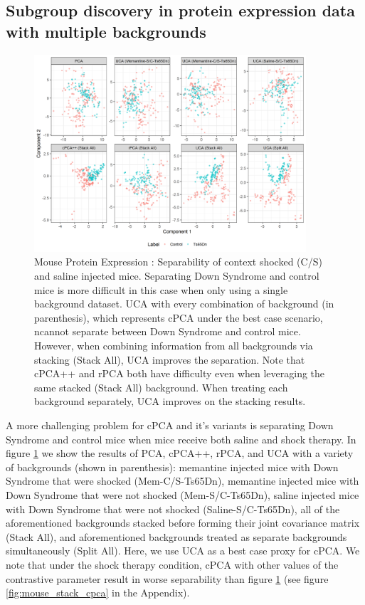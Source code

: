 \documentclass[12pt]{article}
\begin{document}
\subsection{Subgroup discovery in protein expression data with multiple backgrounds}
\begin{figure}[th!]
    \centering
	\includegraphics[width = 0.9\textwidth]{figure/Mouse_split_stack_Ts65Dn.png}
    \caption{Mouse Protein Expression : Separability of context shocked (C/S) and saline injected mice. Separating Down Syndrome and control mice is more difficult in this case when only using a single background dataset. UCA with every combination of background (in parenthesis), which represents cPCA under the best case scenario, ncannot separate between Down Syndrome and control mice. However, when combining information from all backgrounds via stacking (Stack All), UCA improves the separation. Note that cPCA++ and rPCA both have difficulty even when leveraging the same stacked (Stack All) background.  When treating each background separately, UCA improves on the stacking results.}
	    \label{fig:MouseSplitStack}
\end{figure}
A more challenging problem for cPCA and it's variants is separating Down Syndrome and control mice when mice receive both saline and shock therapy.
In figure \ref{fig:MouseSplitStack} we show the results of PCA, cPCA++, rPCA, and UCA with a variety of backgrounds (shown in parenthesis): memantine injected mice with Down Syndrome that were shocked (Mem-C/S-Ts65Dn), memantine injected mice with Down Syndrome that were not shocked (Mem-S/C-Ts65Dn), saline injected mice with Down Syndrome that were not shocked (Saline-S/C-Ts65Dn), all of the aforementioned backgrounds stacked before forming their joint covariance matrix (Stack All), and aforementioned backgrounds treated as separate backgrounds simultaneously (Split All). 
Here, we use UCA as a best case proxy for cPCA.  We note that under the shock therapy condition, cPCA with other values of the contrastive parameter result in worse separability than figure \ref{fig:MouseSplitStack} (see figure \ref{fig:mouse_stack_cpca} in the Appendix). 
\end{document}
